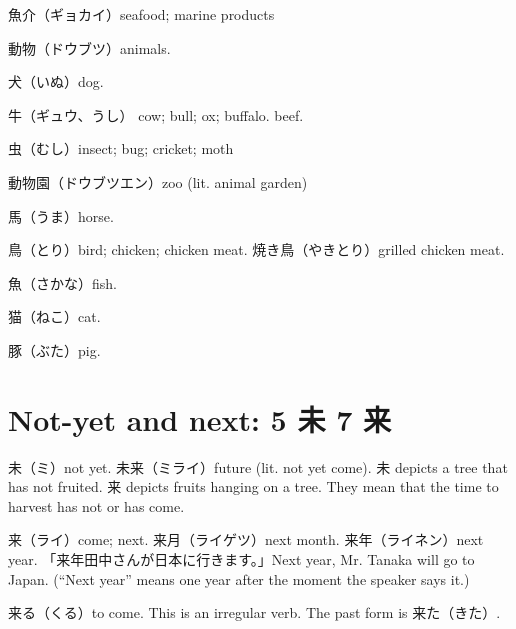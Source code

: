 魚介（ギョカイ）seafood; marine products

動物（ドウブツ）animals.

犬（いぬ）dog.

牛（ギュウ、うし）
cow; bull; ox; buffalo.
beef.

虫（むし）insect; bug; cricket; moth

動物園（ドウブツエン）zoo (lit. animal garden)

馬（うま）horse.

鳥（とり）bird; chicken; chicken meat.
焼き鳥（やきとり）grilled chicken meat.

魚（さかな）fish.

猫（ねこ）cat.

豚（ぶた）pig.

\section{Not-yet and next: 5 未 7 来}

未（ミ）not yet.
未来（ミライ）future (lit. not yet come).
未 depicts a tree that has not fruited.
来 depicts fruits hanging on a tree.
They mean that the time to harvest has not or has come.

来（ライ）come; next.
来月（ライゲツ）next month.
来年（ライネン）next year.
「来年田中さんが日本に行きます。」Next year, Mr. Tanaka will go to Japan.
(``Next year'' means one year after the moment the speaker says it.)

来る（くる）to come.
This is an irregular verb.
The past form is 来た（きた）.
